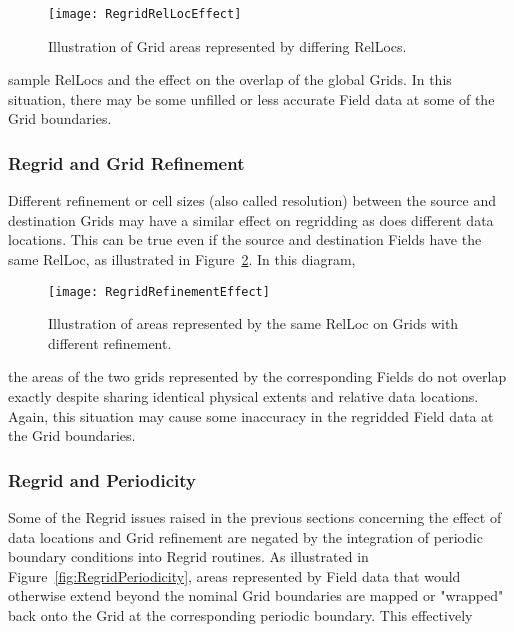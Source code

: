 \begin{center}
\begin{figure}
\caption{Illustration of Grid areas represented by differing RelLocs. }
\label{fig:RegridRelLocEffect}
\resizebox{\textwidth}{!}
  {\texttt{[image: RegridRelLocEffect]}}
\end{figure}
\end{center}

sample RelLocs and the effect on the overlap of the global Grids.  In this
situation, there may be some unfilled or less accurate Field data at some of the
Grid boundaries.


\subsubsection{Regrid and Grid Refinement}

Different refinement or cell sizes (also called resolution) between the source
and destination Grids may have a similar effect on regridding as does different
data locations. This can be true even if the source and destination Fields have
the same RelLoc, as illustrated in Figure~\ref{fig:RegridRefinementEffect}.  In
this diagram,

\begin{center}
\begin{figure}
\caption{Illustration of areas represented by the same RelLoc on Grids with
         different refinement. }
\label{fig:RegridRefinementEffect}
\resizebox{\textwidth}{!}
  {\texttt{[image: RegridRefinementEffect]}}
\end{figure}
\end{center}

the areas of the two grids represented by the corresponding Fields do not overlap
exactly despite sharing identical physical extents and relative data locations.
Again, this situation may cause some inaccuracy in the regridded Field data at
the Grid boundaries.


\subsubsection{Regrid and Periodicity}

Some of the Regrid issues raised in the previous sections concerning the effect
of data locations and Grid refinement are negated by the integration of
periodic boundary conditions into Regrid routines.  As illustrated in
Figure~\ref{fig:RegridPeriodicity}, areas represented by Field data that
would otherwise extend beyond the nominal Grid boundaries are mapped or "wrapped"
back onto the Grid at the corresponding periodic boundary.  This effectively 

